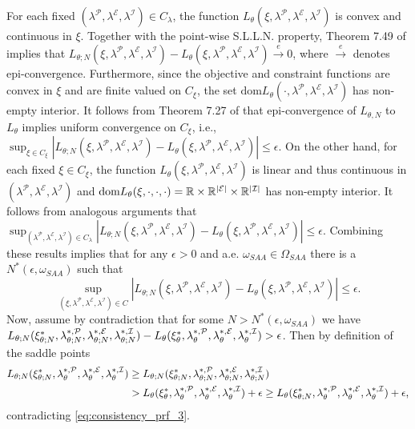 For each fixed $(\lambda^{\mathcal P},\lambda^{\mathcal E},\lambda^{\mathcal I})\in C_\lambda$, the function $L_{\theta}(\xi,\lambda^{\mathcal P},\lambda^{\mathcal E},\lambda^{\mathcal I})$ is convex and continuous in $\xi$.  Together with the point-wise S.L.L.N. property, Theorem 7.49 of \citet{Shapiro2009} implies that $L_{\theta;N}(\xi,\lambda^{\mathcal P},\lambda^{\mathcal E},\lambda^{\mathcal I}) - L_{\theta}(\xi,\lambda^{\mathcal P},\lambda^{\mathcal E},\lambda^{\mathcal I})\overset{e}{\rightarrow}0$, where $\overset{e}{\rightarrow}$ denotes epi-convergence.  Furthermore, since the objective and constraint functions are convex in $\xi$ and are finite valued on $C_\xi$, the set $\text{dom} L_{\theta}(\cdot,\lambda^{\mathcal P},\lambda^{\mathcal E},\lambda^{\mathcal I})$ has non-empty interior. It follows from Theorem 7.27 of  \citet{Shapiro2009} that epi-convergence of $L_{\theta,N}$ to $L_\theta$ implies uniform convergence on $C_\xi$, i.e., $ \sup_{\xi \in C_\xi} \left| L_{\theta;N}(\xi,\lambda^{\mathcal P},\lambda^{\mathcal E},\lambda^{\mathcal I}) - L_{\theta}(\xi,\lambda^{\mathcal P},\lambda^{\mathcal E},\lambda^{\mathcal I})\right| \leq \epsilon
$.
On the other hand, for each fixed $\xi\in C_\xi$,
the function $L_{\theta}(\xi,\lambda^{\mathcal P},\lambda^{\mathcal E},\lambda^{\mathcal I})$ is linear and thus continuous in $(\lambda^{\mathcal P},\lambda^{\mathcal E},\lambda^{\mathcal I})$ and $\text{dom} L_{\theta}(\xi,\cdot,\cdot,\cdot)={\mathbb{R}}\times{\mathbb{R}}^{|\mathcal E|}\times{\mathbb{R}}^{|\mathcal I|}$ has non-empty interior. It follows from analogous arguments that $ \sup_{(\lambda^{\mathcal P},\lambda^{\mathcal E},\lambda^{\mathcal I}) \in C_{\lambda}} \left| L_{\theta;N}(\xi,\lambda^{\mathcal P},\lambda^{\mathcal E},\lambda^{\mathcal I}) - L_{\theta}(\xi,\lambda^{\mathcal P},\lambda^{\mathcal E},\lambda^{\mathcal I})\right| \leq \epsilon$. Combining these results implies
 that for any $\epsilon > 0$ and a.e. $\omega_{SAA} \in \Omega_{SAA}$ there is a $N^*(\epsilon,\omega_{SAA})$ such that
\begin{equation}\label{eq:consistency_prf_3}
    \sup_{(\xi,\lambda^{\mathcal P},\lambda^{\mathcal E},\lambda^{\mathcal I}) \in C} \left| L_{\theta;N}(\xi,\lambda^{\mathcal P},\lambda^{\mathcal E},\lambda^{\mathcal I}) - L_{\theta}(\xi,\lambda^{\mathcal P},\lambda^{\mathcal E},\lambda^{\mathcal I})\right| \leq \epsilon.
\end{equation}
Now, assume by contradiction that for some $N > N^*(\epsilon,\omega_{SAA})$ we have $L_{\theta;N}(\xi^*_{\theta;N},\lambda^{*,\mathcal P}_{\theta;N},\lambda^{*,\mathcal E}_{\theta;N},\lambda^{*,\mathcal I}_{\theta;N}) - L_{\theta}(\xi^*_{\theta},\lambda^{*,\mathcal P}_{\theta},\lambda^{*,\mathcal E}_{\theta},\lambda^{*,\mathcal I}_{\theta}) > \epsilon$. Then by definition of the saddle points
\begin{equation*}
\begin{split}
    L_{\theta;N}(\xi^*_{\theta;N},\lambda^{*,\mathcal P}_{\theta},\lambda^{*,\mathcal E}_{\theta},\lambda^{*,\mathcal I}_{\theta}) &\geq L_{\theta;N}(\xi^*_{\theta;N},\lambda^{*,\mathcal P}_{\theta;N},\lambda^{*,\mathcal E}_{\theta;N},\lambda^{*,\mathcal I}_{\theta;N})  \\ &> L_{\theta}(\xi^*_{\theta},\lambda^{*,\mathcal P}_{\theta},\lambda^{*,\mathcal E}_{\theta},\lambda^{*,\mathcal I}_{\theta}) + \epsilon \geq L_{\theta}(\xi^*_{\theta;N},\lambda^{*,\mathcal P}_{\theta},\lambda^{*,\mathcal E}_{\theta},\lambda^{*,\mathcal I}_{\theta}) + \epsilon,
\end{split}
\end{equation*}
contradicting \eqref{eq:consistency_prf_3}.

